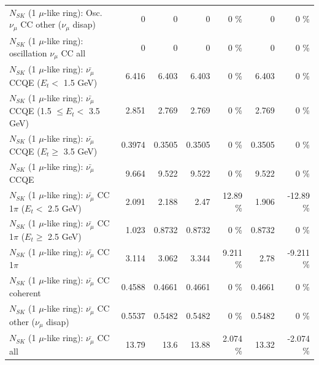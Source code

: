 \begin{table}
\begin{tabular}{| l | r | r | r  r | r  r |}
         $N_{SK}$ (1 $\mu$-like ring): Osc. $\nu_\mu$ CC other ($\nu_\mu$ disap) &               0 &               0 &               0 &        0 \%  &               0 &        0 \%  \\ 
                      $N_{SK}$ (1 $\mu$-like ring): oscillation $\nu_\mu$ CC all &               0 &               0 &               0 &        0 \%  &               0 &        0 \%  \\ 
\hline
\hline
          $N_{SK}$ (1 $\mu$-like ring): $\bar{\nu_\mu}$ CCQE ($E_{t} <$ 1.5 GeV) &           6.416 &           6.403 &           6.403 &        0 \%  &           6.403 &        0 \%  \\ 
 $N_{SK}$ (1 $\mu$-like ring): $\bar{\nu_\mu}$ CCQE (1.5 $\leq E_{t} <$ 3.5 GeV) &           2.851 &           2.769 &           2.769 &        0 \%  &           2.769 &        0 \%  \\ 
       $N_{SK}$ (1 $\mu$-like ring): $\bar{\nu_\mu}$ CCQE ($E_{t} \geq$ 3.5 GeV) &          0.3974 &          0.3505 &          0.3505 &        0 \%  &          0.3505 &        0 \%  \\ 
\hline
                              $N_{SK}$ (1 $\mu$-like ring): $\bar{\nu_\mu}$ CCQE &           9.664 &           9.522 &           9.522 &        0 \%  &           9.522 &        0 \%  \\ 
\hline
     $N_{SK}$ (1 $\mu$-like ring): $\bar{\nu_\mu}$ CC 1$\pi$ ($E_{t} <$ 2.5 GeV) &           2.091 &           2.188 &            2.47 &    12.89 \%  &           1.906 &   -12.89 \%  \\ 
  $N_{SK}$ (1 $\mu$-like ring): $\bar{\nu_\mu}$ CC 1$\pi$ ($E_{t} \geq$ 2.5 GeV) &           1.023 &          0.8732 &          0.8732 &        0 \%  &          0.8732 &        0 \%  \\ 
\hline
                         $N_{SK}$ (1 $\mu$-like ring): $\bar{\nu_\mu}$ CC 1$\pi$ &           3.114 &           3.062 &           3.344 &    9.211 \%  &            2.78 &   -9.211 \%  \\ 
                       $N_{SK}$ (1 $\mu$-like ring): $\bar{\nu_\mu}$ CC coherent &          0.4588 &          0.4661 &          0.4661 &        0 \%  &          0.4661 &        0 \%  \\ 
        $N_{SK}$ (1 $\mu$-like ring): $\bar{\nu_\mu}$ CC other ($\nu_\mu$ disap) &          0.5537 &          0.5482 &          0.5482 &        0 \%  &          0.5482 &        0 \%  \\ 
                          $N_{SK}$ (1 $\mu$-like ring): $\bar{\nu_{\mu}}$ CC all &           13.79 &            13.6 &           13.88 &    2.074 \%  &           13.32 &   -2.074 \%  \\ 

\end{tabular}
\end{table}
